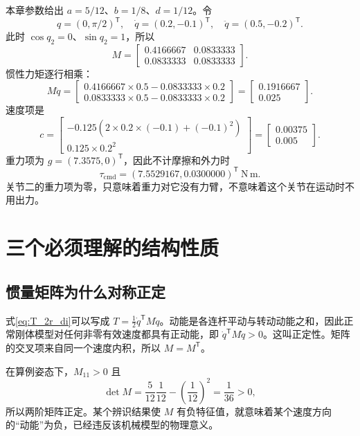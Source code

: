 \begin{examplebox}
本章参数给出 $a=5/12$、$b=1/8$、$d=1/12$。令
\[
 q=(0,\pi/2)^{\mathsf T},\quad\dot q=(0.2,-0.1)^{\mathsf T},\quad
 \ddot q=(0.5,-0.2)^{\mathsf T}.
\]
此时 $\cos q_2=0$、$\sin q_2=1$，所以
\[
 M=\begin{bmatrix}0.4166667&0.0833333\\0.0833333&0.0833333\end{bmatrix}.
\]
惯性力矩逐行相乘：
\[
 M\ddot q=\begin{bmatrix}0.4166667\times0.5-0.0833333\times0.2\\0.0833333\times0.5-0.0833333\times0.2\end{bmatrix}
 =\begin{bmatrix}0.1916667\\0.025\end{bmatrix}.
\]
速度项是
\[
 c=\begin{bmatrix}-0.125(2\times0.2\times(-0.1)+(-0.1)^2)\\0.125\times0.2^2\end{bmatrix}
 =\begin{bmatrix}0.00375\\0.005\end{bmatrix}.
\]
重力项为 $g=(7.3575,0)^{\mathsf T}$，因此不计摩擦和外力时
\[
 \tau_{\mathrm{cmd}}=(7.5529167,0.0300000)^{\mathsf T}\ \mathrm{N\,m}.
\]
关节二的重力项为零，只意味着重力对它没有力臂，不意味着这个关节在运动时不用出力。
\end{examplebox}

\section{三个必须理解的结构性质}
\subsection{惯量矩阵为什么对称正定}
式\eqref{eq:T_2r_di}可以写成 $T=\tfrac12\dot q^{\mathsf T}M\dot q$。动能是各连杆平动与转动动能之和，因此正常刚体模型对任何非零有效速度都具有正动能，即 $\dot q^{\mathsf T}M\dot q>0$。这叫正定性。矩阵的交叉项来自同一个速度内积，所以 $M=M^{\mathsf T}$。

在算例姿态下，$M_{11}>0$ 且
\[
 \det M=\frac5{12}\frac1{12}-\left(\frac1{12}\right)^2=\frac1{36}>0,
\]
所以两阶矩阵正定。某个辨识结果使 $M$ 有负特征值，就意味着某个速度方向的“动能”为负，已经违反该机械模型的物理意义。

